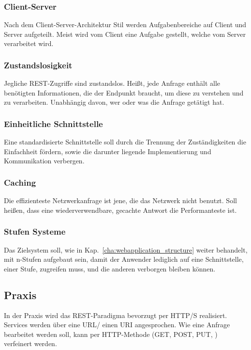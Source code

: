 \subsubsection{Client-Server}
Nach dem Client-Server-Architektur Stil werden Aufgabenbereiche auf Client und Server aufgeteilt. Meist wird vom Client eine Aufgabe gestellt, welche vom Server verarbeitet wird. 
\subsubsection{Zustandslosigkeit}
Jegliche REST-Zugriffe sind zustandslos. Heißt, jede Anfrage enthält alle benötigten Informationen, die der Endpunkt braucht, um diese zu verstehen und zu verarbeiten. Unabhängig davon, wer oder was die Anfrage getätigt hat.  
\subsubsection{Einheitliche Schnittstelle}
Eine standardisierte Schnittstelle soll durch die Trennung der Zuständigkeiten die Einfachheit fördern, sowie die darunter liegende Implementierung und Kommunikation verbergen. 
\subsubsection{Caching}
Die effizienteste Netzwerkanfrage ist jene, die das Netzwerk nicht benutzt.
Soll heißen, dass eine wiederverwendbare, gecachte  Antwort die Performanteste ist. 
\subsubsection{Stufen Systeme}
Das Zielsystem soll, wie in Kap.~\ref{cha:webapplication_structure} weiter behandelt, mit n-Stufen aufgebaut sein, damit der Anwender lediglich auf eine Schnittstelle, einer Stufe, zugreifen muss, und die anderen verborgen bleiben können.

\subsection{Praxis}
In der Praxis wird das REST-Paradigma bevorzugt per HTTP/S realisiert. Services werden über eine URL/ einen URI angesprochen. Wie eine Anfrage bearbeitet werden soll, kann per HTTP-Methode (GET, POST, PUT, \etc) verfeinert werden. 
